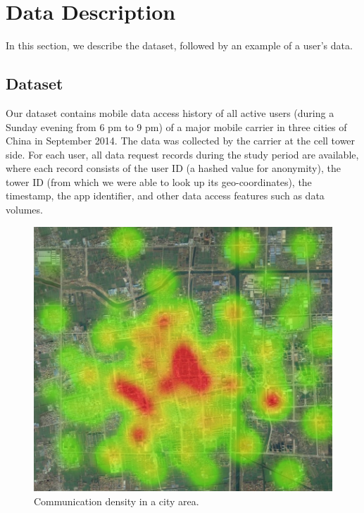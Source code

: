 \section{Data Description}\label{data}

In this section, we describe the dataset, followed by an example of a user's data.

\subsection{Dataset}

Our dataset contains mobile data access history of all active users (during a Sunday evening from 6 pm to 9 pm)
of a major mobile carrier in three cities of China in September 2014. The data was collected by the carrier at the cell tower side.
For each user, all data request records during the study period are available,
where each record consists of the user ID (a hashed value for anonymity),
the tower ID (from which we were able to look up its geo-coordinates),
the timestamp,
the app identifier,
and other data access features such as data volumes.


 \begin{figure}[h]
     \centering
     \includegraphics[width=0.4\linewidth]{./figures/hotmap.jpg}
     \caption{Communication density in a city area.}
     \label{fig:city_sample}
     \vspace{-0.1in}
 \end{figure}

